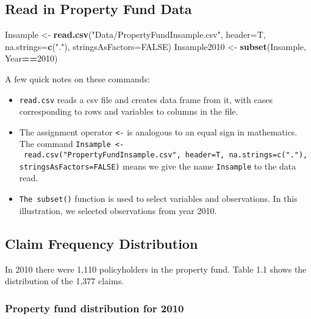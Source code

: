 \documentclass[]{book}
\newenvironment{Shaded}{\begin{snugshade}}{\end{snugshade}}
\newcommand{\KeywordTok}[1]{\textcolor[rgb]{0.13,0.29,0.53}{\textbf{#1}}}
\newcommand{\DataTypeTok}[1]{\textcolor[rgb]{0.13,0.29,0.53}{#1}}
\newcommand{\DecValTok}[1]{\textcolor[rgb]{0.00,0.00,0.81}{#1}}
\newcommand{\StringTok}[1]{\textcolor[rgb]{0.31,0.60,0.02}{#1}}
\newcommand{\OtherTok}[1]{\textcolor[rgb]{0.56,0.35,0.01}{#1}}
\newcommand{\OperatorTok}[1]{\textcolor[rgb]{0.81,0.36,0.00}{\textbf{#1}}}
\newcommand{\NormalTok}[1]{#1}
\theoremstyle{definition}
\theoremstyle{definition}
\theoremstyle{definition}
\theoremstyle{remark}
\begin{document}
\subsection{Read in Property Fund
Data}\label{read-in-property-fund-data}

\begin{Shaded}
\begin{Highlighting}[]
\NormalTok{Insample <-}\StringTok{ }\KeywordTok{read.csv}\NormalTok{(}\StringTok{"Data/PropertyFundInsample.csv"}\NormalTok{, }\DataTypeTok{header=}\NormalTok{T, }\DataTypeTok{na.strings=}\KeywordTok{c}\NormalTok{(}\StringTok{"."}\NormalTok{), }\DataTypeTok{stringsAsFactors=}\OtherTok{FALSE}\NormalTok{)}
\NormalTok{Insample2010 <-}\StringTok{ }\KeywordTok{subset}\NormalTok{(Insample, Year}\OperatorTok{==}\DecValTok{2010}\NormalTok{)}
\end{Highlighting}
\end{Shaded}

A few quick notes on these commands:

\begin{itemize}
\item
  \texttt{read.csv} reads a csv file and creates data frame from it,
  with cases corresponding to rows and variables to columns in the file.
\item
  The assignment operator \texttt{\textless{}-} is analogous to an equal
  sign in mathematics. The command
  \texttt{Insample\ \textless{}-\ read.csv("PropertyFundInsample.csv",\ header=T,\ na.strings=c("."),\ stringsAsFactors=FALSE)}
  means we give the name \texttt{Insample} to the data read.
\item
  \texttt{The\ subset()} function is used to select variables and
  observations. In this illustration, we selected observations from year
  2010.
\end{itemize}

\subsection{Claim Frequency
Distribution}\label{claim-frequency-distribution}

In 2010 there were 1,110 policyholders in the property fund. Table 1.1
shows the distribution of the 1,377 claims.

\subsubsection{Property fund distribution for
2010}\label{property-fund-distribution-for-2010}
\end{document}
